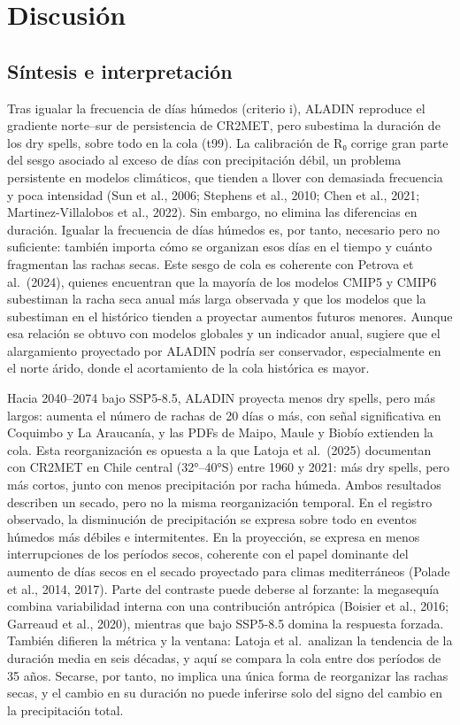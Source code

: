 \chapter{Discusión}\label{cap:6}

\section{Síntesis e interpretación}\label{sec:sintesis}

Tras igualar la frecuencia de días húmedos (criterio i), ALADIN reproduce el gradiente norte--sur de persistencia de CR2MET, pero subestima la duración de los dry spells, sobre todo en la cola (t99). La calibración de R₀ corrige gran parte del sesgo asociado al exceso de días con precipitación débil, un problema persistente en modelos climáticos, que tienden a llover con demasiada frecuencia y poca intensidad (Sun et al., 2006; Stephens et al., 2010; Chen et al., 2021; Martinez-Villalobos et al., 2022). Sin embargo, no elimina las diferencias en duración. Igualar la frecuencia de días húmedos es, por tanto, necesario pero no suficiente: también importa cómo se organizan esos días en el tiempo y cuánto fragmentan las rachas secas. Este sesgo de cola es coherente con Petrova et al.~(2024), quienes encuentran que la mayoría de los modelos CMIP5 y CMIP6 subestiman la racha seca anual más larga observada y que los modelos que la subestiman en el histórico tienden a proyectar aumentos futuros menores. Aunque esa relación se obtuvo con modelos globales y un indicador anual, sugiere que el alargamiento proyectado por ALADIN podría ser conservador, especialmente en el norte árido, donde el acortamiento de la cola histórica es mayor.

Hacia 2040--2074 bajo SSP5-8.5, ALADIN proyecta menos dry spells, pero más largos: aumenta el número de rachas de 20 días o más, con señal significativa en Coquimbo y La Araucanía, y las PDFs de Maipo, Maule y Biobío extienden la cola. Esta reorganización es opuesta a la que Latoja et al.~(2025) documentan con CR2MET en Chile central (32°--40°S) entre 1960 y 2021: más dry spells, pero más cortos, junto con menos precipitación por racha húmeda. Ambos resultados describen un secado, pero no la misma reorganización temporal. En el registro observado, la disminución de precipitación se expresa sobre todo en eventos húmedos más débiles e intermitentes. En la proyección, se expresa en menos interrupciones de los períodos secos, coherente con el papel dominante del aumento de días secos en el secado proyectado para climas mediterráneos (Polade et al., 2014, 2017). Parte del contraste puede deberse al forzante: la megasequía combina variabilidad interna con una contribución antrópica (Boisier et al., 2016; Garreaud et al., 2020), mientras que bajo SSP5-8.5 domina la respuesta forzada. También difieren la métrica y la ventana: Latoja et al.~analizan la tendencia de la duración media en seis décadas, y aquí se compara la cola entre dos períodos de 35 años. Secarse, por tanto, no implica una única forma de reorganizar las rachas secas, y el cambio en su duración no puede inferirse solo del signo del cambio en la precipitación total.

